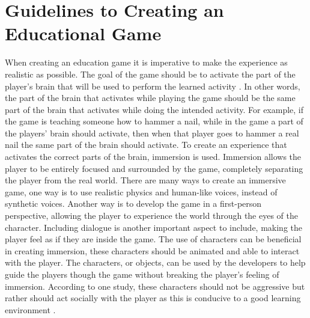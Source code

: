 \section{Guidelines to Creating an Educational Game} \label{guidlines}
When creating an education game it is imperative to make the experience as realistic as possible. The goal of the game should be to activate the part of the player's brain that will be used to perform the learned activity \cite{Tobias2014}. In other words, the part of the brain that activates while playing the game should be the same part of the brain that activates while doing the intended activity. For example, if the game is teaching someone how to hammer a nail, while in the game a part of the players' brain should activate, then when that player goes to hammer a real nail the same part of the brain should activate. To create an experience that activates the correct parts of the brain, immersion is used. Immersion allows the player to be entirely focused and surrounded by the game, completely separating the player from the real world. There are many ways to create an immersive game, one way is to use realistic physics and human-like voices, instead of synthetic voices. Another way is to develop the game in a first-person perspective, allowing the player to experience the world through the eyes of the character. Including dialogue is another important aspect to include, making the player feel as if they are inside the game. The use of characters can be beneficial in creating immersion, these characters should be animated and able to interact with the player. The characters, or objects, can be used by the developers to help guide the players though the game without breaking the player's feeling of immersion. According to one study, these characters should not be aggressive but rather should act socially with the player as this is conducive to a good learning environment \cite{Tobias2014}.


